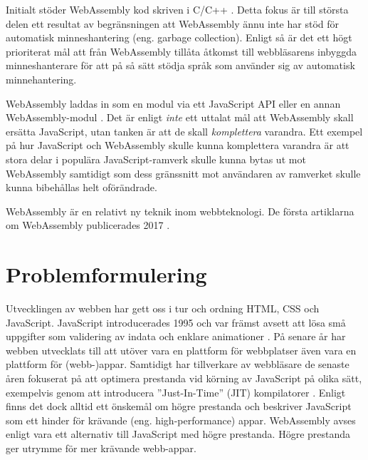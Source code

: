 \documentclass[swedish,template=rapport]{his}
\begin{document}
Initialt stöder WebAssembly kod skriven i C/C++ \parencite{HaasRossbergSchuffTitzerHolmanGohmanWagnerZakaiBastien2017}. Detta fokus är till största delen ett resultat av begränsningen att WebAssembly ännu inte har stöd för automatisk minneshantering (eng. garbage collection). Enligt \textcite{HaasRossbergSchuffTitzerHolmanGohmanWagnerZakaiBastien2017} så är det ett högt prioriterat mål att från WebAssembly tillåta åtkomst till webbläsarens inbyggda minneshanterare för att på så sätt stödja språk som använder sig av automatisk minnehantering.

WebAssembly laddas in som en modul via ett JavaScript API eller en annan WebAssembly-modul \parencite{HaasRossbergSchuffTitzerHolmanGohmanWagnerZakaiBastien2017}. Det är enligt \textcite{Moller2018} \emph{inte} ett uttalat mål att WebAssembly skall ersätta JavaScript, utan tanken är att de skall \emph{komplettera} varandra. Ett exempel på hur JavaScript och WebAssembly skulle kunna komplettera varandra är att stora delar i populära JavaScript-ramverk skulle kunna bytas ut mot WebAssembly samtidigt som dess gränssnitt mot användaren av ramverket skulle kunna bibehållas helt oförändrade.

WebAssembly är en relativt ny teknik inom webbteknologi. De första artiklarna om WebAssembly publicerades 2017 \parencite{HaasRossbergSchuffTitzerHolmanGohmanWagnerZakaiBastien2017,ReiserBlaser2017}.

\clearpage

\section{Problemformulering}

Utvecklingen av webben har gett oss i tur och ordning HTML, CSS och JavaScript. JavaScript introducerades 1995 och var främst avsett att lösa små uppgifter som validering av indata och enklare animationer \parencite{Moller2018}. På senare år har webben utvecklats till att utöver vara en plattform för webbplatser även vara en plattform för (webb-)appar. Samtidigt har tillverkare av webbläsare de senaste åren fokuserat på att optimera prestanda vid körning av JavaScript på olika sätt, exempelvis genom att introducera ''Just-In-Time'' (JIT) kompilatorer \parencite{HerreraChenLavoieHendren2018}. Enligt \textcite{ReiserBlaser2017} finns det dock alltid ett önskemål om högre prestanda och \textcite{Zakai2018} beskriver JavaScript som ett hinder för krävande (eng. high-performance) appar. WebAssembly avses enligt \textcite{HaasRossbergSchuffTitzerHolmanGohmanWagnerZakaiBastien2017} vara ett alternativ till JavaScript med högre prestanda. Högre prestanda ger utrymme för mer krävande webb-appar.
\end{document}
